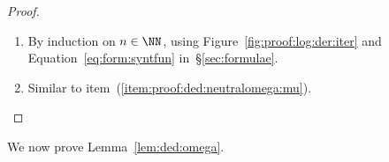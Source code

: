 \begin{proof}
\hfill
\begin{enumerate}[(1)]
\item 
By induction on $n \in \NN$,
using Figure~\ref{fig:proof:log:der:iter}
and Equation~\eqref{eq:form:syntfun} in~\S\ref{sec:formulae}.

\item
Similar to item~(\ref{item:proof:ded:neutralomega:mu}).
\qedhere
\end{enumerate}
\end{proof}



We now prove Lemma~\ref{lem:ded:omega}.

\LemNeutralOmega*

